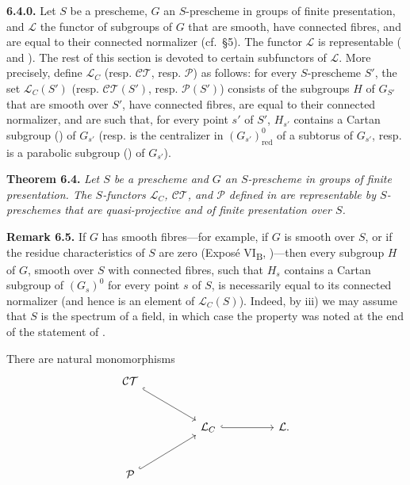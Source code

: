 \textbf{6.4.0.} Let \(S\) be a prescheme, \(G\) an \(S\)-prescheme in groups of finite
presentation, and \(\mathcal{L}\) the functor of subgroups of \(G\) that are smooth,
have connected fibres, and are equal to their connected normalizer (cf.~§5).
The functor \(\mathcal{L}\) is representable ( and ). The rest of this section
is devoted to certain subfunctors of \(\mathcal{L}\). More precisely, define
\(\mathcal{L}_{C}\) (resp. \(\mathcal{CT}\), resp. \(\mathcal{P}\)) as follows:
for every \(S\)-prescheme \(S'\), the set \(\mathcal{L}_{C}(S')\)
(resp. \(\mathcal{CT}(S')\), resp. \(\mathcal{P}(S')\)) consists of the subgroups
\(H\) of \(G_{S'}\) that are smooth over \(S'\), have connected fibres, are equal
to their connected normalizer, and are such that, for every point \(s'\) of \(S'\),
\(H_{s'}\) contains a Cartan subgroup () of \(G_{s'}\)
(resp. is the centralizer in \((G_{s'})^{0}_{\mathrm{red}}\) of a subtorus of
\(G_{s'}\), resp. is a parabolic subgroup () of \(G_{s'}\)).

\textbf{Theorem 6.4.} \emph{Let \(S\) be a prescheme and \(G\) an \(S\)-prescheme in
groups of finite presentation. The \(S\)-functors \(\mathcal{L}_{C}\),
\(\mathcal{CT}\), and \(\mathcal{P}\) defined in  are representable by
\(S\)-preschemes that are quasi-projective and of finite presentation over \(S\).}

\textbf{Remark 6.5.} If \(G\) has smooth fibres---for example, if \(G\) is smooth
over \(S\), or if the residue characteristics of \(S\) are zero
(Exposé VI\textsubscript{B}, )---then every subgroup \(H\) of \(G\), smooth over
\(S\) with connected fibres, such that \(H_s\) contains a Cartan subgroup of
\((G_s)^0\) for every point \(s\) of \(S\), is necessarily equal to its connected
normalizer (and hence is an element of \(\mathcal{L}_{C}(S)\)). Indeed, by  iii)
we may assume that \(S\) is the spectrum of a field, in which case the property was
noted at the end of the statement of .

There are natural monomorphisms
\[
\begin{tikzcd}[column sep=huge,row sep=large]
\mathcal{CT} \arrow[dr,hook] & \\
& \mathcal{L}_{C} \arrow[r,hook] & \mathcal{L}.\\
\mathcal{P} \arrow[ur,hook] &
\end{tikzcd}
\]

